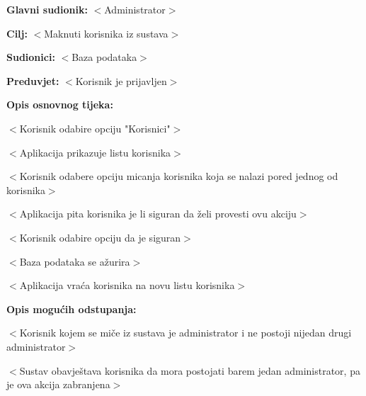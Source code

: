 					\noindent {}
					\begin{packed_item}

						\item \textbf{Glavni sudionik: }$<$Administrator$>$
						\item  \textbf{Cilj:} $<$Maknuti korisnika iz sustava$>$
						\item  \textbf{Sudionici:} $<$Baza podataka$>$
						\item  \textbf{Preduvjet:} $<$Korisnik je prijavljen$>$
						\item  \textbf{Opis osnovnog tijeka:}

						\item[] \begin{packed_enum}

							\item $<$Korisnik odabire opciju "Korisnici"$>$
							\item $<$Aplikacija prikazuje listu korisnika$>$
							\item $<$Korisnik odabere opciju micanja korisnika koja se nalazi pored jednog od korisnika$>$
							\item $<$Aplikacija pita korisnika je li siguran da želi provesti ovu akciju$>$
							\item $<$Korisnik odabire opciju da je siguran$>$
							\item $<$Baza podataka se ažurira$>$
							\item $<$Aplikacija vraća korisnika na novu listu korisnika$>$

						\end{packed_enum}

						\item  \textbf{Opis mogućih odstupanja:}

						\item[] \begin{packed_item}

							\item[3.a] $<$Korisnik kojem se miče iz sustava je administrator i ne postoji nijedan
							drugi administrator$>$
							\item[] \begin{packed_enum}

								\item $<$Sustav obavještava korisnika da mora postojati
								barem jedan administrator, pa je ova akcija zabranjena$>$

							\end{packed_enum}

						\end{packed_item}
					\end{packed_item}
					
